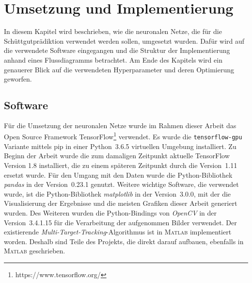 \chapter{Umsetzung und Implementierung}
\label{cap:impl}

In diesem Kapitel wird beschrieben, wie die neuronalen Netze, die für die Schüttgut\-prädiktion verwendet werden sollen,
umgesetzt wurden.
Dafür wird auf die verwendete Software eingegangen und die Struktur der Implementierung anhand eines Flussdiagramms betrachtet.
Am Ende des Kapitels wird ein genauerer Blick auf die verwendeten Hyperparameter und deren Optimierung geworfen.



\section{Software}


Für die Umsetzung der neuronalen Netze wurde im Rahmen dieser Arbeit 
das Open Source Framework TensorFlow\footnote{https://www.tensorflow.org/} verwendet.
Es wurde die \texttt{tensorflow-gpu} Variante mittels pip in einer Python~3.6.5 virtuellen Umgebung installiert.
Zu Beginn der Arbeit wurde die zum damaligen Zeitpunkt aktuelle TensorFlow Version 1.8 installiert, die zu einem späteren Zeitpunkt durch die Version~1.11 ersetzt wurde.
Für den Umgang mit den Daten wurde die Python-Bibliothek \textit{pandas} in der Version~0.23.1 genutzt.
Weitere wichtige Software, die verwendet wurde,
ist die Python-Bibliothek \textit{matplotlib} in der Version~3.0.0, mit der die Visualisierung der Ergebnisse und die meisten Grafiken dieser Arbeit generiert wurden.
Des Weiteren wurden die Python-Bindings von \textit{OpenCV} in der Version~3.4.1.15 für die Verarbeitung der aufgenommen Bilder verwendet.
Der existierende \textit{Multi-Target-Tracking}-Algorithmus ist in \textsc{Matlab} implementiert worden. 
Deshalb sind Teile des Projekts, die direkt darauf aufbauen, ebenfalls in \textsc{Matlab} geschrieben.

